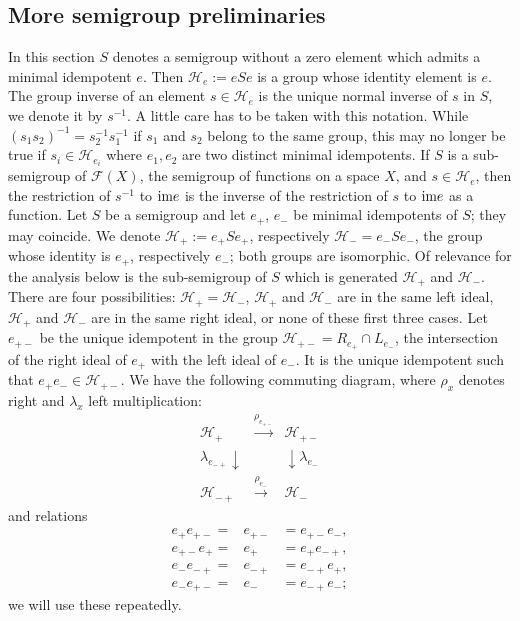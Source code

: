 \documentclass[12pt]{amsart}
\theoremstyle{definition}
\numberwithin{equation}{section}
\newcommand{\Ff}{{\mathcal F}}
\newcommand{\Hh}{{\mathcal H}}
\newcommand{\im}{\mbox{\rm im}}
\begin{document}
\subsection{More semigroup preliminaries}\label{preliminaries}
%
In this section $S$ denotes a semigroup without a zero element which admits a minimal idempotent $e$. Then $\Hh_e := e S e$ is a group whose identity element is $e$. The group inverse of an element $s\in \Hh_e$ is the unique normal inverse of $s$ in $S$, 
we denote it by $s^{-1}$. A little care has to be taken with this notation. 
While $(s_1s_2)^{-1} = s_2^{-1} s_1^{-1}$ if $s_1$ and $s_2$ belong to the same group, this may no longer be true if $s_i \in \Hh_{e_i}$ where $e_1,e_2$ are two distinct minimal idempotents. If $S$ is a sub-semigroup of $\Ff(X)$, the semigroup of functions on a space $X$, and $s\in\Hh_e$, then the restriction of $s^{-1}$ to
  $\im e$  is the inverse of the restriction of $s$ to $\im e$ as a function.
Let $S$ be a semigroup %
and let $e_+$, $e_-$ be minimal idempotents of $S$; they may coincide. 
We denote $\Hh_{+}:=e_+S e_+$, respectively $\Hh_{-}=e_-Se_-$,  the group whose identity is $e_+$, respectively $e_-$; both groups are isomorphic. Of relevance for the analysis below is the sub-semigroup of $S$ which is generated $\Hh_{+}$ and $\Hh_{-}$. There are four possibilities: $\Hh_{+}=\Hh_{-}$, $\Hh_+$ and $\Hh_-$ are in the same left ideal, $\Hh_+$ and $\Hh_-$ are in the same right ideal, or none of these first three cases. Let $e_{+-}$ be the unique idempotent in the group $\Hh_{{+-}}=R_{e_+}\cap L_{e_-}$, the intersection of the right ideal of $e_+$ with the left ideal of $e_-$.  It is the unique idempotent such that $e_+e_-\in \Hh_{{+-}}$. We have the following commuting diagram, where $\rho_x$ denotes right and $\lambda_x$ left multiplication: 
\[
\begin{array}{rcl}
\Hh_+  & \stackrel{\rho_{e_{+-}}} \longrightarrow & \Hh_{+-}\\
\lambda_{e_{-+}} \downarrow & & \downarrow \lambda_{e_{-}} \\
\Hh_{-+}  & \stackrel{\rho_{e_{-}}} \longrightarrow & \Hh_{-}
\end{array}
\]
and relations
\begin{eqnarray*}
e_+ e_{+-} = &e_{+-}& = e_{+-}e_- , \\ e_{+-} e_{+} = &e_+& = e_{+}e_{-+} ,  \\ e_{-}e_{-+}  = &e_{-+} &= e_{-+}e_{+} , \\
e_{-} e_{+-} = &e_{-}& = e_{-+}e_{-};
\end{eqnarray*}
we will use these repeatedly.
\end{document}
